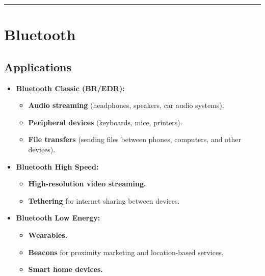 \documentclass[a4paper, 12pt]{book} %
\begin{document}
\begin{center}\rule{0.5\linewidth}{0.5pt}\end{center}

\section{Bluetooth}\label{bluetooth-1}

\subsection{Applications}\label{applications}

\begin{itemize}
\tightlist
\item
  \textbf{Bluetooth Classic (BR/EDR):}

  \begin{itemize}
  \tightlist
  \item
    \textbf{Audio streaming} (headphones, speakers, car audio
    systems).\\
  \item
    \textbf{Peripheral devices} (keyboards, mice, printers).\\
  \item
    \textbf{File transfers} (sending files between phones, computers,
    and other devices).
  \end{itemize}
\item
  \textbf{Bluetooth High Speed:}

  \begin{itemize}
  \tightlist
  \item
    \textbf{High-resolution video streaming.}\\
  \item
    \textbf{Tethering} for internet sharing between devices.
  \end{itemize}
\item
  \textbf{Bluetooth Low Energy:}

  \begin{itemize}
  \tightlist
  \item
    \textbf{Wearables.}\\
  \item
    \textbf{Beacons} for proximity marketing and location-based
    services.\\
  \item
    \textbf{Smart home devices.}
  \end{itemize}
\end{itemize}
\end{document}
